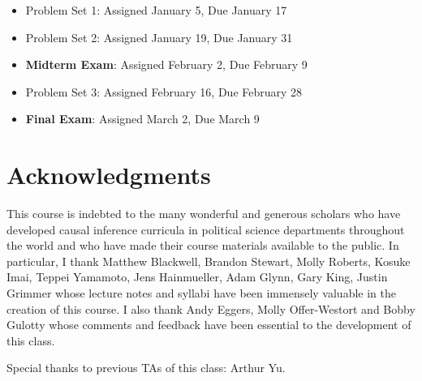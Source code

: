 \documentclass[11pt, article, oneside]{memoir}
\theoremstyle{Assumption}
\begin{document}
\begin{itemize}
\item Problem Set 1: Assigned January 5, Due January 17
\item Problem Set 2: Assigned January 19, Due January 31
\item \textbf{Midterm Exam}: Assigned February 2, Due February 9
\item Problem Set 3: Assigned February 16, Due February 28
\item \textbf{Final Exam}: Assigned March 2, Due March 9 
\end{itemize}

\section*{Acknowledgments}

This course is indebted to the many wonderful and generous scholars who have developed causal inference curricula in political science departments throughout the world and who have made their course materials available to the public. In particular, I thank Matthew Blackwell, Brandon Stewart, Molly Roberts, Kosuke Imai, Teppei Yamamoto, Jens Hainmueller, Adam Glynn, Gary King, Justin Grimmer whose lecture notes and syllabi have been immensely valuable in the creation of this course. I also thank Andy Eggers, Molly Offer-Westort and Bobby Gulotty whose comments and feedback have been essential to the development of this class.

Special thanks to previous TAs of this class: Arthur Yu.
\end{document}
